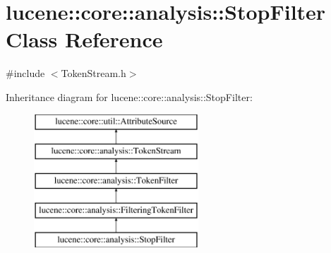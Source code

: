 \hypertarget{classlucene_1_1core_1_1analysis_1_1StopFilter}{}\section{lucene\+:\+:core\+:\+:analysis\+:\+:Stop\+Filter Class Reference}
\label{classlucene_1_1core_1_1analysis_1_1StopFilter}


{\ttfamily \#include $<$Token\+Stream.\+h$>$}

Inheritance diagram for lucene\+:\+:core\+:\+:analysis\+:\+:Stop\+Filter\+:\begin{figure}[H]
\begin{center}
\leavevmode
\includegraphics[height=5.000000cm]{classlucene_1_1core_1_1analysis_1_1StopFilter}
\end{center}
\end{figure}
